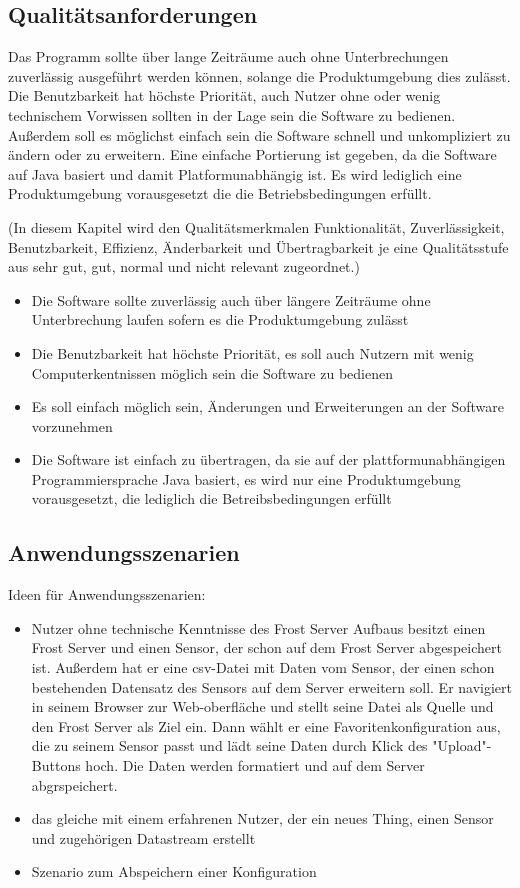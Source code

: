 \documentclass[12 pt]{article}
\begin{document}
	
	\subsection{Qualitätsanforderungen}
	Das Programm sollte über lange Zeiträume auch ohne Unterbrechungen zuverlässig ausgeführt werden können, solange die Produktumgebung dies zulässt.
	Die Benutzbarkeit hat höchste Priorität, auch Nutzer ohne oder wenig technischem Vorwissen sollten in der Lage sein die Software zu bedienen.
	Außerdem soll es möglichst einfach sein die Software schnell und unkompliziert zu ändern oder zu erweitern.
	Eine einfache Portierung ist gegeben, da die Software auf Java basiert und damit Platformunabhängig ist. Es wird lediglich eine Produktumgebung vorausgesetzt die die Betriebsbedingungen erfüllt.
	
	(In diesem Kapitel wird den Qualitätsmerkmalen Funktionalität, Zuverlässigkeit, Benutzbarkeit, Effizienz, Änderbarkeit und Übertragbarkeit je eine Qualitätsstufe aus sehr gut, gut, normal und nicht relevant zugeordnet.)
	\begin{itemize}
		\item Die Software sollte zuverlässig auch über längere Zeiträume ohne Unterbrechung laufen sofern es die Produktumgebung zulässt
		\item Die Benutzbarkeit hat höchste Priorität, es soll auch Nutzern mit wenig Computerkentnissen möglich sein die Software zu bedienen
		\item Es soll einfach möglich sein, Änderungen und Erweiterungen an der Software vorzunehmen
		\item Die Software ist einfach zu übertragen, da sie auf der plattformunabhängigen Programmiersprache Java basiert, es wird nur eine Produktumgebung vorausgesetzt, die lediglich die Betreibsbedingungen erfüllt
	\end{itemize}
	
	\subsection{Anwendungsszenarien}
	Ideen für Anwendungsszenarien:
	\begin{itemize}
		\item Nutzer ohne technische Kenntnisse des Frost Server Aufbaus besitzt einen Frost Server und einen Sensor, der schon auf dem Frost Server abgespeichert ist. Außerdem hat er eine csv-Datei mit Daten vom Sensor, der einen schon bestehenden Datensatz des Sensors auf dem Server erweitern soll. Er navigiert in seinem Browser zur Web-oberfläche und stellt seine Datei als Quelle und den Frost Server als Ziel ein. Dann wählt er eine Favoritenkonfiguration aus, die zu seinem Sensor passt und lädt seine Daten durch Klick des "Upload"-Buttons hoch. Die Daten werden formatiert und auf dem Server abgrspeichert.
		\item das gleiche mit einem erfahrenen Nutzer, der ein neues Thing, einen Sensor und zugehörigen Datastream erstellt
		\item Szenario zum Abspeichern einer Konfiguration
	\end{itemize}
	
\end{document}
